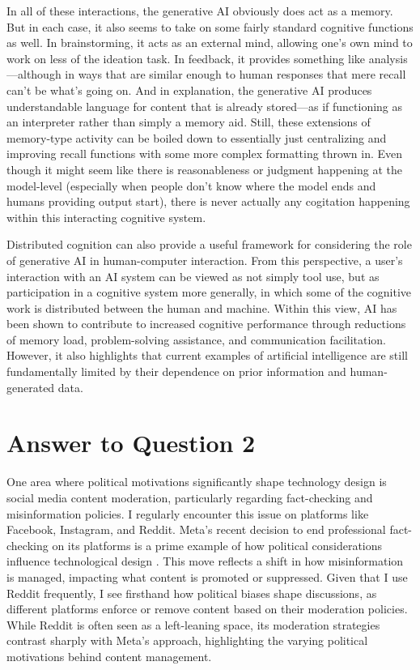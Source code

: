 \documentclass[
	letterpaper, %
]{jdf}
\begin{document}
In all of these interactions, the generative AI obviously does act as a memory. But in each case, it also seems to take on some fairly standard cognitive functions as well. In brainstorming, it acts as an external mind, allowing one’s own mind to work on less of the ideation task. In feedback, it provides something like analysis—although in ways that are similar enough to human responses that mere recall can’t be what’s going on. And in explanation, the generative AI produces understandable language for content that is already stored—as if functioning as an interpreter rather than simply a memory aid. Still, these extensions of memory-type activity can be boiled down to essentially just centralizing and improving recall functions with some more complex formatting thrown in. Even though it might seem like there is reasonableness or judgment happening at the model-level (especially when people don’t know where the model ends and humans providing output start), there is never actually any cogitation happening within this interacting cognitive system.

Distributed cognition can also provide a useful framework for considering the role of generative AI in human-computer interaction. From this perspective, a user’s interaction with an AI system can be viewed as not simply tool use, but as participation in a cognitive system more generally, in which some of the cognitive work is distributed between the human and machine. Within this view, AI has been shown to contribute to increased cognitive performance through reductions of memory load, problem-solving assistance, and communication facilitation. However, it also highlights that current examples of artificial intelligence are still fundamentally limited by their dependence on prior information and human-generated data.
\hfill \break

\section{Answer to Question 2}
One area where political motivations significantly shape technology design is social media content moderation, particularly regarding fact-checking and misinformation policies. I regularly encounter this issue on platforms like Facebook, Instagram, and Reddit. Meta’s recent decision to end professional fact-checking on its platforms is a prime example of how political considerations influence technological design . This move reflects a shift in how misinformation is managed, impacting what content is promoted or suppressed. Given that I use Reddit frequently, I see firsthand how political biases shape discussions, as different platforms enforce or remove content based on their moderation policies. While Reddit is often seen as a left-leaning space, its moderation strategies contrast sharply with Meta's approach, highlighting the varying political motivations behind content management.
\end{document}
